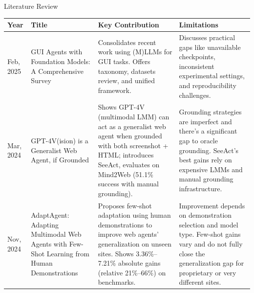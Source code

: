\begin{frame}{Literature Review}
  \lrtable
  \begin{tabularx}{\textwidth}{p{0.7cm} p{2.8cm} X X}
    \toprule
    \textbf{Year} & \textbf{Title} & \textbf{Key Contribution} & \textbf{Limitations} \\
    \midrule
    Feb, 2025 \cite{wang2025guiagentsfoundationmodels}
    & GUI Agents with Foundation Models: A Comprehensive Survey
    & Consolidates recent work using (M)LLMs for GUI tasks. Offers taxonomy, datasets review, and unified framework.
    & Discusses practical gaps like unavailable checkpoints, inconsistent experimental settings, and reproducibility challenges. \\
    \addlinespace
    Mar, 2024 \cite{SeeAct}
    & GPT-4V(ision) is a Generalist Web Agent, if Grounded
    & Shows GPT-4V (multimodal LMM) can act as a generalist web agent when grounded with both screenshot + HTML; introduces SeeAct, evaluates on Mind2Web (51.1\% success with manual grounding).
    & Grounding strategies are imperfect and there's a significant gap to oracle grounding. SeeAct's best gains rely on expensive LMMs and manual grounding infrastructure. \\
    \addlinespace
    Nov, 2024 \cite{FewShotLearning:verma2024adaptagentadaptingmultimodalweb}
    & AdaptAgent: Adapting Multimodal Web Agents with Few-Shot Learning from Human Demonstrations
    & Proposes few-shot adaptation using human demonstrations to improve web agents' generalization on unseen sites. Shows 3.36\%--7.21\% absolute gains (relative 21\%--66\%) on benchmarks.
    & Improvement depends on demonstration selection and model type. Few-shot gains vary and do not fully close the generalization gap for proprietary or very different sites. \\
    \bottomrule
  \end{tabularx}
\end{frame}
